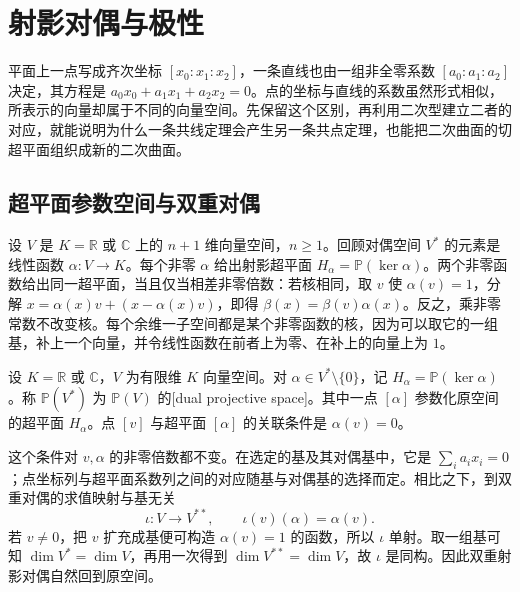 
% 
% 

\section{射影对偶与极性}
\label{g1:sec:0204}

平面上一点写成齐次坐标 \([x_0:x_1:x_2]\)，一条直线也由一组非全零系数 \([a_0:a_1:a_2]\) 决定，其方程是 \(a_0x_0+a_1x_1+a_2x_2=0\)。点的坐标与直线的系数虽然形式相似，所表示的向量却属于不同的向量空间。先保留这个区别，再利用二次型建立二者的对应，就能说明为什么一条共线定理会产生另一条共点定理，也能把二次曲面的切超平面组织成新的二次曲面。

\subsection{超平面参数空间与双重对偶}
\label{g1:subsec:0204:01}

设 \(V\) 是 \(K=\mathbb R\) 或 \(\mathbb C\) 上的 \(n+1\) 维向量空间，\(n\ge1\)。回顾对偶空间 \(V^*\) 的元素是线性函数 \(\alpha:V\rightarrow K\)。每个非零 \(\alpha\) 给出射影超平面 \(H_\alpha=\mathbb P(\ker\alpha)\)。两个非零函数给出同一超平面，当且仅当相差非零倍数：若核相同，取 \(v\) 使 \(\alpha(v)=1\)，分解 \(x=\alpha(x)v+(x-\alpha(x)v)\)，即得 \(\beta(x)=\beta(v)\alpha(x)\)。反之，乘非零常数不改变核。每个余维一子空间都是某个非零函数的核，因为可以取它的一组基，补上一个向量，并令线性函数在前者上为零、在补上的向量上为 \(1\)。

\begin{definition}\label{g1:def:projective-dual}
	设 \(K=\mathbb R\) 或 \(\mathbb C\)，\(V\) 为有限维 \(K\) 向量空间。对 \(\alpha\in V^*\setminus\{0\}\)，记 \(H_\alpha=\mathbb P(\ker\alpha)\)。称 \(\mathbb P(V^*)\) 为 \(\mathbb P(V)\) 的[dual projective space]。其中一点 \([\alpha]\) 参数化原空间的超平面 \(H_\alpha\)。点 \([v]\) 与超平面 \([\alpha]\) 的关联条件是 \(\alpha(v)=0\)。
\end{definition}

这个条件对 \(v,\alpha\) 的非零倍数都不变。在选定的基及其对偶基中，它是 \(\sum_i a_ix_i=0\)；点坐标列与超平面系数列之间的对应随基与对偶基的选择而定。相比之下，到双重对偶的求值映射与基无关
\[
	\iota:V\longrightarrow V^{**},\qquad
	\iota(v)(\alpha)=\alpha(v).
\]
若 \(v\ne0\)，把 \(v\) 扩充成基便可构造 \(\alpha(v)=1\) 的函数，所以 \(\iota\) 单射。取一组基可知 \(\dim V^*=\dim V\)，再用一次得到 \(\dim V^{**}=\dim V\)，故 \(\iota\) 是同构。因此双重射影对偶自然回到原空间。

